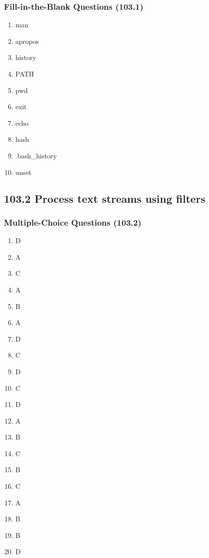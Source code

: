 \documentclass[a4paper]{report}
\begin{document}
\subsubsection*{Fill-in-the-Blank Questions (103.1)}

\begin{enumerate}[1.]
    \item man
    \item apropos
    \item history
    \item PATH
    \item pwd
    \item exit
    \item echo
    \item hash
    \item .bash\_history
    \item unset
\end{enumerate}


\subsection*{103.2 Process text streams using filters}
\subsubsection*{Multiple-Choice Questions (103.2)}

\begin{enumerate}[1.]
    \item D
    \item A
    \item C
    \item A
    \item B
    \item A
    \item D
    \item C
    \item D
    \item C
    \item D
    \item A
    \item B
    \item C
    \item B
    \item C
    \item A
    \item B
    \item B
    \item D
\end{enumerate}
\end{document}
